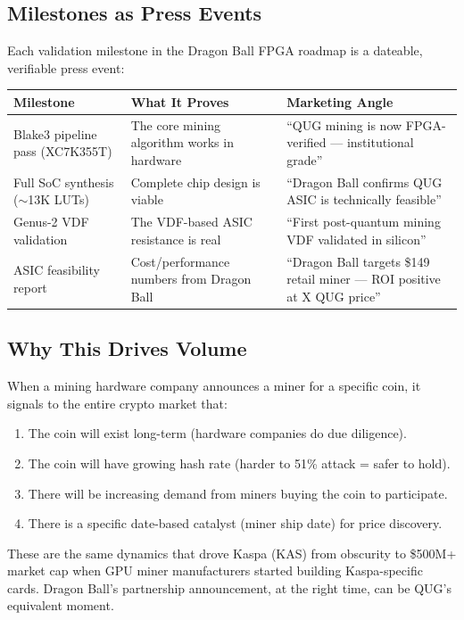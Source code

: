 \documentclass[11pt,a4paper]{article}
\begin{document}
\subsection{Milestones as Press Events}

Each validation milestone in the Dragon Ball FPGA roadmap is a dateable, verifiable press event:

\begin{center}
\begin{tabular}{L{3cm} L{5.5cm} L{4.5cm}}
  \toprule
  \textbf{Milestone} & \textbf{What It Proves} & \textbf{Marketing Angle} \\
  \midrule
  Blake3 pipeline pass (XC7K355T) & The core mining algorithm works in hardware & ``QUG mining is now FPGA-verified — institutional grade'' \\
  Full SoC synthesis ($\sim$13K LUTs) & Complete chip design is viable & ``Dragon Ball confirms QUG ASIC is technically feasible'' \\
  Genus-2 VDF validation & The VDF-based ASIC resistance is real & ``First post-quantum mining VDF validated in silicon'' \\
  ASIC feasibility report & Cost/performance numbers from Dragon Ball & ``Dragon Ball targets \$149 retail miner — ROI positive at X QUG price'' \\
  \bottomrule
\end{tabular}
\end{center}

\subsection{Why This Drives Volume}

When a mining hardware company announces a miner for a specific coin, it signals to the entire crypto market that:
\begin{enumerate}[leftmargin=1.5em]
  \item The coin will exist long-term (hardware companies do due diligence).
  \item The coin will have growing hash rate (harder to 51\% attack = safer to hold).
  \item There will be increasing demand from miners buying the coin to participate.
  \item There is a specific date-based catalyst (miner ship date) for price discovery.
\end{enumerate}

These are the same dynamics that drove Kaspa (KAS) from obscurity to \$500M+ market cap when GPU miner manufacturers started building Kaspa-specific cards. Dragon Ball's partnership announcement, at the right time, can be QUG's equivalent moment.
\end{document}
